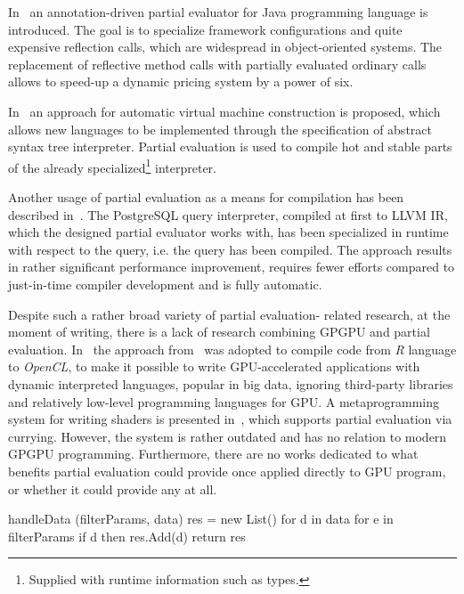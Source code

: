 In~\cite{JavaPe} an annotation-driven partial evaluator for Java programming language is introduced.
The goal is to specialize framework configurations and quite expensive reflection calls, which are widespread in object-oriented systems. The replacement of reflective method calls with partially evaluated ordinary calls allows to speed-up a dynamic pricing system by a power of six.

In~\cite{SuperVm} an approach for automatic virtual machine construction is proposed, which allows new languages to be implemented through the specification of abstract syntax tree interpreter. Partial evaluation is used to compile hot and stable parts of the already specialized\footnote{Supplied with runtime information such as types.} interpreter.

Another usage of partial evaluation as a means for compilation has been described in~\cite{LLVMmix}. 
The PostgreSQL query interpreter, compiled at first to LLVM IR, which 
the designed partial evaluator works with, has been specialized in 
runtime with respect to the query, i.e. the query has been compiled. 
The approach results in rather significant performance improvement, 
requires fewer efforts compared to just-in-time compiler development 
and is fully automatic.


Despite such a rather broad variety of partial evaluation- related research, at the moment of writing, there is a lack of research combining GPGPU and partial evaluation.
In~\cite{JitGPUPE} the approach from~\cite{SuperVm} was adopted to compile code from \emph{R} language to \emph{OpenCL}, to make it possible to write GPU-accelerated applications with dynamic interpreted languages, popular in big data, ignoring third-party libraries and relatively low-level programming languages for GPU. A metaprogramming system for writing shaders is presented in~\cite{GPUsh}, which supports partial evaluation via currying. However, the system is rather outdated and has no relation to modern GPGPU programming. Furthermore, there are no works dedicated to what benefits partial evaluation could provide once applied directly to GPU program, or whether it could provide any at all.

\begin{listing}
    \begin{pyglist}[language=Java,label=fig:kernel,caption=A typical GPGPU kernel]
handleData (filterParams, data) {
    res = new List()
    for d in data
        for e in filterParams
            if d %
            then res.Add(d)
    return res
}
        
    \end{pyglist}
\end{listing}


